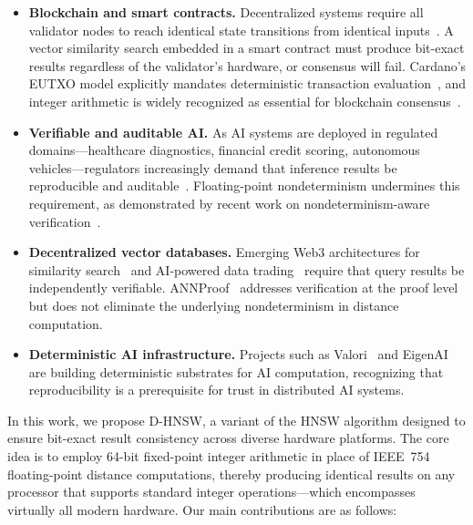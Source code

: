\documentclass[10pt,journal]{IEEEtran}
\newcommand{\dhnsw}{\textsc{D-HNSW}}
\newcommand{\hnsw}{\textsc{HNSW}}
\begin{document}
\begin{itemize}[leftmargin=*]
  \item \textbf{Blockchain and smart contracts.} Decentralized systems require all validator nodes to reach identical state transitions from identical inputs~\cite{buterin2014ethereum, lai2022blockchain}. A vector similarity search embedded in a smart contract must produce bit-exact results regardless of the validator's hardware, or consensus will fail. Cardano's EUTXO model explicitly mandates deterministic transaction evaluation~\cite{cardano2024fees}, and integer arithmetic is widely recognized as essential for blockchain consensus~\cite{decenomy2024integer}.

  \item \textbf{Verifiable and auditable AI.} As AI systems are deployed in regulated domains---healthcare diagnostics, financial credit scoring, autonomous vehicles---regulators increasingly demand that inference results be reproducible and auditable~\cite{alves2026eigenai}. Floating-point nondeterminism undermines this requirement, as demonstrated by recent work on nondeterminism-aware verification~\cite{yao2025nao}.

  \item \textbf{Decentralized vector databases.} Emerging Web3 architectures for similarity search~\cite{keizer2023ditto, lee2024decentface} and AI-powered data trading~\cite{zhang2024nmft} require that query results be independently verifiable. ANNProof~\cite{lu2024annproof} addresses verification at the proof level but does not eliminate the underlying nondeterminism in distance computation.

  \item \textbf{Deterministic AI infrastructure.} Projects such as Valori~\cite{gudur2025valori} and EigenAI~\cite{alves2026eigenai} are building deterministic substrates for AI computation, recognizing that reproducibility is a prerequisite for trust in distributed AI systems.
\end{itemize}

\noindent In this work, we propose \dhnsw{}, a variant of the \hnsw{} algorithm designed to ensure bit-exact result consistency across diverse hardware platforms. The core idea is to employ 64-bit fixed-point integer arithmetic in place of IEEE~754 floating-point distance computations, thereby producing identical results on any processor that supports standard integer operations---which encompasses virtually all modern hardware. Our main contributions are as follows:
\end{document}
